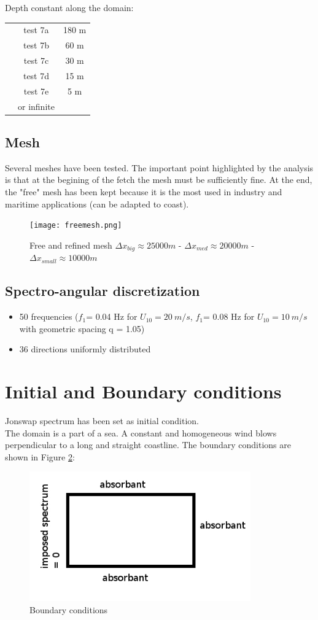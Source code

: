 Depth constant along the domain:
\begin{tabular}{ccc}
 & test 7a & 180 m\\
 & test 7b & 60 m\\
& test 7c & 30 m\\
& test 7d & 15 m\\
& test 7e & 5 m\\
 & or infinite\\
\end{tabular}
\subsection{Mesh}
Several meshes have been tested. The important point highlighted by the analysis is that at the begining of the fetch the mesh must be sufficiently fine. At the end, the "free" mesh has been kept because it is the most used in industry and maritime applications (can be adapted to coast).
\begin{figure}[H]
\centering
\texttt{[image: freemesh.png]}
\caption{Free and refined mesh $\Delta x_{big} \approx 25 000 m$ - $\Delta x_{med} \approx 20 000 m$ - $\Delta x_{small} \approx 10 000 m$}
\label{meshfet}
\end{figure}

\subsection{Spectro-angular discretization}
\begin{itemize}
\item 50 frequencies ($f_1 $= 0.04 Hz for $U_{10} = 20~m/s$, $f_1 $= 0.08 Hz for $U_{10} = 10~m/s$ with geometric spacing q = 1.05)
\item 36 directions uniformly distributed
\end{itemize}

\section{Initial and Boundary conditions}
Jonswap spectrum has been set as initial condition.\\
The domain is a part of a sea. A constant and homogeneous wind blows perpendicular to a long and straight coastline. The boundary conditions are shown in Figure \ref{boundaryfet}:
\begin{figure}
\centering
\includegraphics[width=0.85\textwidth]{boundarycond.jpg}
\caption{Boundary conditions}
\label{boundaryfet}
\end{figure}
